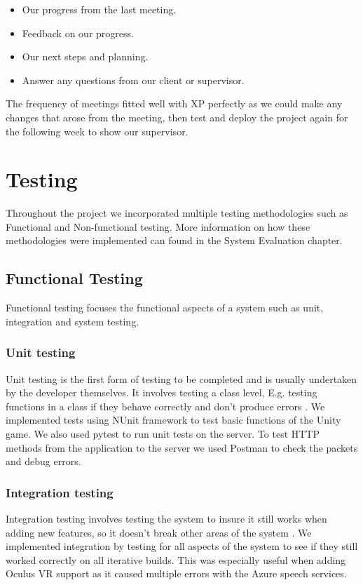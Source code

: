 \begin{itemize}
  \item Our progress from the last meeting.
  \item Feedback on our progress.
  \item Our next steps and planning.
  \item Answer any questions from our client or supervisor. 
\end{itemize}

The frequency of meetings fitted well with XP perfectly as we could make any changes that arose from the meeting, then test and deploy the project again for the following week to show our supervisor.

\section{Testing}
Throughout the project we incorporated multiple testing methodologies such as Functional and Non-functional testing. More information on how these methodologies were implemented can found in the System Evaluation chapter.

\subsection{Functional Testing}
Functional testing focuses the functional aspects of a system such as unit, integration and system testing.

\subsubsection{Unit testing}
Unit testing is the first form of testing to be completed and is usually undertaken by the developer themselves. It involves testing a class level, E.g. testing functions in a class if they behave correctly and don't produce errors \cite{5380492}. We implemented tests using NUnit framework to test basic functions of the Unity game. We also used pytest to run unit tests on the server. To test HTTP methods from the application to the server we used Postman to check the packets and debug errors.

\subsubsection{Integration testing}
Integration testing involves testing the system to insure it still works when adding new features, so it doesn't break other areas of the system \cite{5380492}. We implemented integration by testing for all aspects of the system to see if they still worked correctly on all iterative builds. This was especially useful when adding Oculus VR support as it caused multiple errors with the Azure speech services.

